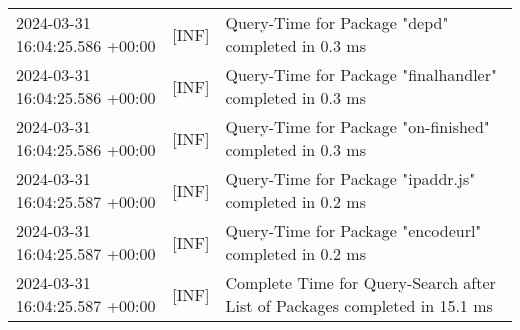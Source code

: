 {{\begin{tabularx}{\textwidth}{|l|l|X|}
                    2024-03-31 16:04:25.586 +00:00 & [INF] & Query-Time for Package "depd" completed in 0.3 ms \\
                    2024-03-31 16:04:25.586 +00:00 & [INF] & Query-Time for Package "finalhandler" completed in 0.3 ms \\
                    2024-03-31 16:04:25.586 +00:00 & [INF] & Query-Time for Package "on-finished" completed in 0.3 ms \\
                    2024-03-31 16:04:25.587 +00:00 & [INF] & Query-Time for Package "ipaddr.js" completed in 0.2 ms \\
                    2024-03-31 16:04:25.587 +00:00 & [INF] & Query-Time for Package "encodeurl" completed in 0.2 ms \\
                    2024-03-31 16:04:25.587 +00:00 & [INF] & Complete Time for Query-Search after List of Packages completed in 15.1 ms \\
                    \hline
                \end{tabularx}
            }
        }

